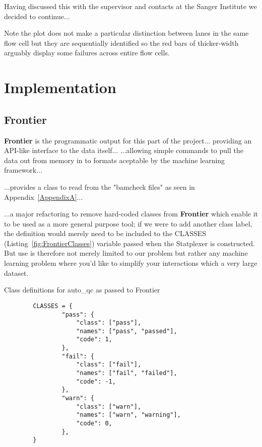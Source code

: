 Having discussed this with the supervisor and contacts at the Sanger Institute
we decided to continue...

Note the plot does not make a particular distinction between lanes in the same
flow cell but they are sequentially identified so the red bars of thicker-width
arguably display some failures across entire flow cells.

\section{Implementation}
\subsection{Frontier}
\textbf{Frontier} is the programmatic output for this part of the project...
providing an API-like interface to the data itself... ...allowing simple
commands to pull the data out from memory in to formats aceptable by the machine
learning framework...

...provides a class to read from the "bamcheck files" as seen in
Appendix~\ref{AppendixA}...

...a major refactoring to remove hard-coded classes from \textbf{Frontier} which
enable it to be used as a more general purpose tool; if we were to add another
class label, the definition would merely need to be included to the CLASSES
(Listing~\ref{fig:FrontierClasses}) variable passed when the Statplexer is
constructed. But use is therefore not merely limited to our problem but rather
any machine learning problem where you'd like to simplify your interactions
which a very large dataset.

\begin{listing}[H]
    \caption[FrontierClasses]{Class definitions for auto\_qc as passed to Frontier}
    \label{fig:FrontierClasses}
    \begin{verbatim}
        CLASSES = {
                "pass": {
                    "class": ["pass"],
                    "names": ["pass", "passed"],
                    "code": 1,
                },
                "fail": {
                    "class": ["fail"],
                    "names": ["fail", "failed"],
                    "code": -1,
                },
                "warn": {
                    "class": ["warn"],
                    "names": ["warn", "warning"],
                    "code": 0,
                },
        }
    \end{verbatim}
\end{listing}

